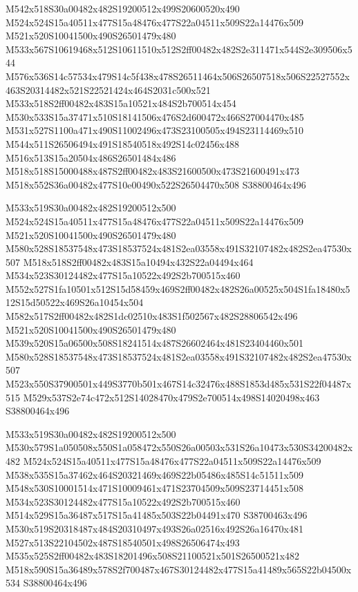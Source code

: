 \documentclass{article}
\begin{document}
\begin{multicols}{2}
M542x518S30a00482x482S19200512x499S20600520x490 M524x524S15a40511x477S15a48476x477S22a04511x509S22a14476x509 M521x520S10041500x490S26501479x480 M533x567S10619468x512S10611510x512S2ff00482x482S2e311471x544S2e309506x544 M576x536S14c57534x479S14c5f438x478S26511464x506S26507518x506S22527552x463S20314482x521S22521424x464S2031c500x521 M533x518S2ff00482x483S15a10521x484S2b700514x454 M530x533S15a37471x510S18141506x476S2d600472x466S27004470x485 M531x527S1100a471x490S11002496x473S23100505x494S23114469x510 M544x511S26506494x491S18540518x492S14c02456x488 M516x513S15a20504x486S26501484x486 M518x518S15000488x487S2ff00482x483S21600500x473S21600491x473 M518x552S36a00482x477S10e00490x522S26504470x508 S38800464x496

M533x519S30a00482x482S19200512x500 M524x524S15a40511x477S15a48476x477S22a04511x509S22a14476x509 M521x520S10041500x490S26501479x480 M580x528S18537548x473S18537524x481S2ea03558x491S32107482x482S2ea47530x507 M518x518S2ff00482x483S15a10494x432S22a04494x464 M534x523S30124482x477S15a10522x492S2b700515x460 M552x527S1fa10501x512S15d58459x469S2ff00482x482S26a00525x504S1fa18480x512S15d50522x469S26a10454x504 M582x517S2ff00482x482S1dc02510x483S1f502567x482S28806542x496 M521x520S10041500x490S26501479x480 M539x520S15a06500x508S18241514x487S26602464x481S23404460x501 M580x528S18537548x473S18537524x481S2ea03558x491S32107482x482S2ea47530x507 M523x550S37900501x449S3770b501x467S14c32476x488S1853d485x531S22f04487x515 M529x537S2e74c472x512S14028470x479S2e700514x498S14020498x463 S38800464x496

M533x519S30a00482x482S19200512x500 M530x579S1a050508x550S1a058472x550S26a00503x531S26a10473x530S34200482x482 M524x524S15a40511x477S15a48476x477S22a04511x509S22a14476x509 M538x535S15a37462x464S20321469x469S22b05486x485S14c51511x509 M548x530S10001514x471S10009461x471S23704509x509S23714451x508 M534x523S30124482x477S15a10522x492S2b700515x460 M514x529S15a36487x517S15a41485x503S22b04491x470 S38700463x496 M530x519S20318487x484S20310497x493S26a02516x492S26a16470x481 M527x513S22104502x487S18540501x498S26506474x493 M535x525S2ff00482x483S18201496x508S21100521x501S26500521x482 M518x590S15a36489x578S2f700487x467S30124482x477S15a41489x565S22b04500x534 S38800464x496


\end{multicols}
\end{document}
